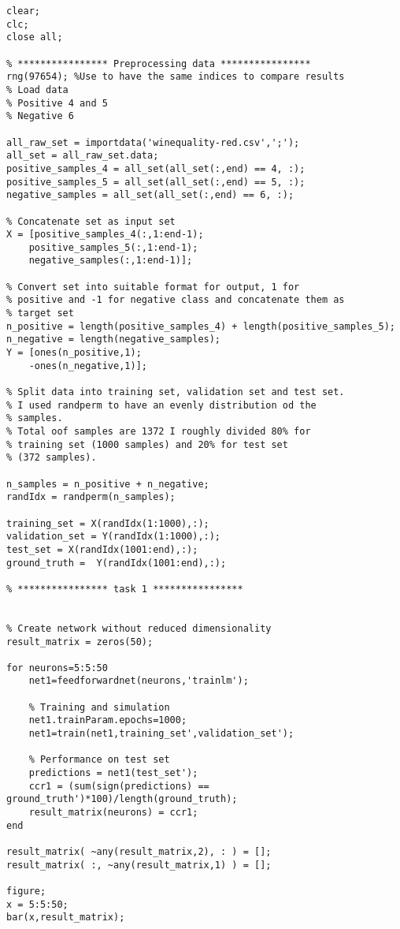 \begin{lstlisting}[frame=single]
clear;
clc;
close all;

% **************** Preprocessing data ****************
rng(97654); %Use to have the same indices to compare results
% Load data
% Positive 4 and 5
% Negative 6

all_raw_set = importdata('winequality-red.csv',';');
all_set = all_raw_set.data;
positive_samples_4 = all_set(all_set(:,end) == 4, :);
positive_samples_5 = all_set(all_set(:,end) == 5, :);
negative_samples = all_set(all_set(:,end) == 6, :);

% Concatenate set as input set 
X = [positive_samples_4(:,1:end-1); 
    positive_samples_5(:,1:end-1);
    negative_samples(:,1:end-1)];

% Convert set into suitable format for output, 1 for 
% positive and -1 for negative class and concatenate them as 
% target set
n_positive = length(positive_samples_4) + length(positive_samples_5);
n_negative = length(negative_samples);
Y = [ones(n_positive,1);
    -ones(n_negative,1)];

% Split data into training set, validation set and test set.
% I used randperm to have an evenly distribution od the 
% samples.
% Total oof samples are 1372 I roughly divided 80% for 
% training set (1000 samples) and 20% for test set
% (372 samples).

n_samples = n_positive + n_negative;
randIdx = randperm(n_samples);

training_set = X(randIdx(1:1000),:);
validation_set = Y(randIdx(1:1000),:);
test_set = X(randIdx(1001:end),:);
ground_truth =  Y(randIdx(1001:end),:);

% **************** task 1 ****************


% Create network without reduced dimensionality
result_matrix = zeros(50);

for neurons=5:5:50
	net1=feedforwardnet(neurons,'trainlm');

	% Training and simulation
	net1.trainParam.epochs=1000;
	net1=train(net1,training_set',validation_set');

	% Performance on test set
	predictions = net1(test_set');
	ccr1 = (sum(sign(predictions) == ground_truth')*100)/length(ground_truth);
	result_matrix(neurons) = ccr1;
end

result_matrix( ~any(result_matrix,2), : ) = [];
result_matrix( :, ~any(result_matrix,1) ) = [];

figure;
x = 5:5:50;
bar(x,result_matrix);


\end{lstlisting}
